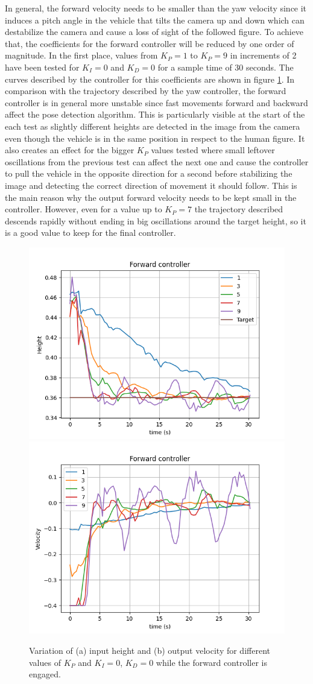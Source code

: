 In general, the forward velocity needs to be smaller than the yaw velocity since it induces a pitch angle in the vehicle that tilts the camera up and down which can destabilize the camera and cause a loss of sight of the followed figure.
To achieve that, the coefficients for the forward controller will be reduced by one order of magnitude.
In the first place, values from $K_P=1$ to $K_P=9$ in increments of 2 have been tested for $K_I=0$ and $K_D=0$ for a sample time of 30 seconds.
The curves described by the controller for this coefficients are shown in figure \ref{fig:tune-fwd-prop}.
In comparison with the trajectory described by the yaw controller, the forward controller is in general more unstable since fast movements forward and backward affect the pose detection algorithm.
This is particularly visible at the start of the each test as slightly different heights are detected in the image from the camera even though the vehicle is in the same position in respect to the human figure.
It also creates an effect for the bigger $K_P$ values tested where small leftover oscillations from the previous test can affect the next one and cause the controller to pull the vehicle in the opposite direction for a second before stabilizing the image and detecting the correct direction of movement it should follow.
This is the main reason why the output forward velocity needs to be kept small in the controller.
However, even for a value up to $K_P=7$ the trajectory described descends rapidly without ending in big oscillations around the target height, so it is a good value to keep for the final controller.


\begin{figure}
  \centering
  \includegraphics[width=.45\linewidth]{img/pid/fwd/fwd_pos_prop_i0_d0.png}
  \includegraphics[width=.45\linewidth]{img/pid/fwd/fwd_vel_prop_i0_d0.png}
  \caption{Variation of (a) input height and (b) output velocity for different values of $K_{P}$ and $K_I=0$, $K_D=0$ while the forward controller is engaged.}\label{fig:tune-fwd-prop}
\end{figure}


